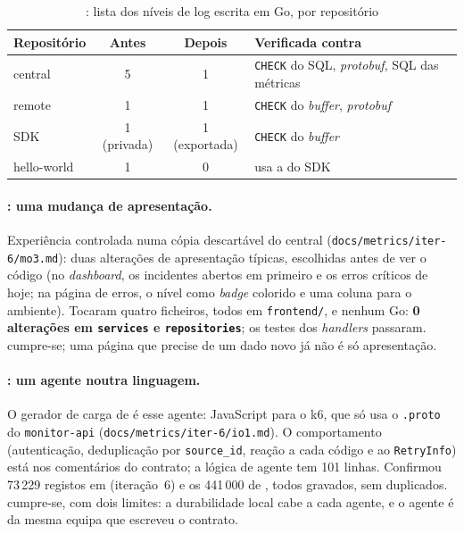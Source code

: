 \begin{table}[htbp]
  \centering\small
  \caption{: lista dos níveis de log escrita em Go, por repositório}
  \label{tab:mo2}
  \begin{tabular}{lccl}
    \toprule
    Repositório & Antes & Depois & Verificada contra \\
    \midrule
    central & 5 & 1 & \texttt{CHECK} do SQL, \emph{protobuf}, SQL das métricas \\
    remote & 1 & 1 & \texttt{CHECK} do \emph{buffer}, \emph{protobuf} \\
    SDK & 1 (privada) & 1 (exportada) & \texttt{CHECK} do \emph{buffer} \\
    hello-world & 1 & 0 & usa a do SDK \\
    \bottomrule
  \end{tabular}
\end{table}

\paragraph{: uma mudança de apresentação.}
Experiência controlada numa cópia descartável do central (\texttt{docs/metrics/iter-6/mo3.md}): duas alterações de
apresentação típicas, escolhidas antes de ver o código (no \emph{dashboard}, os incidentes abertos em primeiro e os
erros críticos de hoje; na página de erros, o nível como \emph{badge} colorido e uma coluna para o ambiente).
Tocaram quatro ficheiros, todos em \texttt{frontend/}, e nenhum Go: \textbf{0 alterações em \texttt{services} e
\texttt{repositories}}; os testes dos \emph{handlers} passaram.  cumpre-se; uma página que precise de um dado
novo já não é só apresentação.

\paragraph{: um agente noutra linguagem.}
O gerador de carga de  é esse agente: JavaScript para o k6, que só usa o \texttt{.proto} do
\texttt{monitor-api} (\texttt{docs/metrics/iter-6/io1.md}). O comportamento (autenticação, deduplicação por
\texttt{source\_id}, reação a cada código e ao \texttt{RetryInfo}) está nos comentários do contrato; a lógica de
agente tem 101 linhas. Confirmou 73\,229 registos em  (iteração~6) e os 441\,000 de , todos
gravados, sem duplicados.  cumpre-se, com dois limites: a durabilidade local cabe a cada agente, e o agente
é da mesma equipa que escreveu o contrato.

